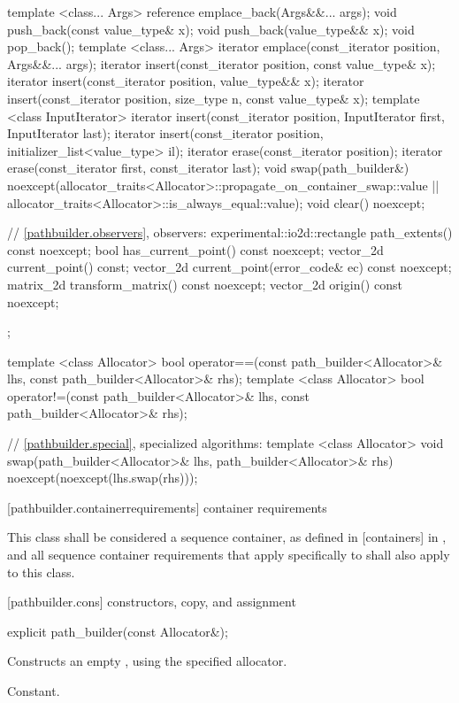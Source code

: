 \begin{codeblock}
{{{{{    template <class... Args>
    reference emplace_back(Args&&... args);
    void push_back(const value_type& x);
    void push_back(value_type&& x);
    void pop_back();
    template <class... Args>
    iterator emplace(const_iterator position, Args&&... args);
    iterator insert(const_iterator position, const value_type& x);
    iterator insert(const_iterator position, value_type&& x);
    iterator insert(const_iterator position, size_type n, const value_type& x);
    template <class InputIterator>
    iterator insert(const_iterator position, InputIterator first,
      InputIterator last);
    iterator insert(const_iterator position,
      initializer_list<value_type> il);
    iterator erase(const_iterator position);
    iterator erase(const_iterator first, const_iterator last);
    void swap(path_builder&)
      noexcept(allocator_traits<Allocator>::propagate_on_container_swap::value 
        || allocator_traits<Allocator>::is_always_equal::value);
    void clear() noexcept;

    // \ref{pathbuilder.observers}, observers:
    experimental::io2d::rectangle path_extents() const noexcept;
    bool has_current_point() const noexcept;
    vector_2d current_point() const;
    vector_2d current_point(error_code& ec) const noexcept;
    matrix_2d transform_matrix() const noexcept;
    vector_2d origin() const noexcept;
  };
  
  template <class Allocator>
  bool operator==(const path_builder<Allocator>& lhs, 
    const path_builder<Allocator>& rhs);
  template <class Allocator>
  bool operator!=(const path_builder<Allocator>& lhs, 
    const path_builder<Allocator>& rhs);
  
  // \ref{pathbuilder.special}, specialized algorithms:
  template <class Allocator>
  void swap(path_builder<Allocator>& lhs, path_builder<Allocator>& rhs)
    noexcept(noexcept(lhs.swap(rhs)));
} } } }
\end{codeblock}

 [pathbuilder.containerrequirements] { container requirements}

\pnum
This class shall be considered a sequence container, as defined in [containers] in \cppseventeen, and all sequence container requirements that apply specifically to  shall also apply to this class.

 [pathbuilder.cons] { constructors, copy, and assignment}

\begin{itemdecl}
	explicit path_builder(const Allocator&);
\end{itemdecl}
\begin{itemdescr}
	\pnum
	\effects
	Constructs an empty , using the specified allocator.
	
	\pnum
	\complexity
	Constant.
\end{itemdescr}

